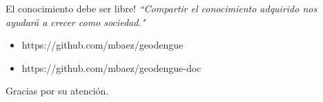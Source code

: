 
\begin{frame}[c]{El conocimiento debe ser libre!}
    \textit{``Compartir el conocimiento adquirido nos ayudará a crecer como sociedad."}
    \begin{center}
    \begin{itemize}
        \item https://github.com/mbaez/geodengue
        \item https://github.com/mbaez/geodengue-doc
    \end{itemize}
    \end{center}
\end{frame}


\begin{frame}[c]{}
    \begin{center}
    Gracias por su atención.
    \end{center}
\end{frame}
